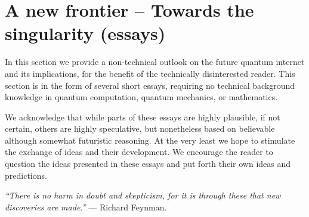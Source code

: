 %
%

\section{A new frontier -- Towards the singularity (essays)} \label{sec:outlook}  

In this section we provide a non-technical outlook on the future quantum internet and its implications, for the benefit of the technically disinterested reader. This section is in the form of several short essays, requiring no technical background knowledge in quantum computation, quantum mechanics, or mathematics.

We acknowledge that while parts of these essays are highly plausible, if not certain, others are highly speculative, but nonetheless based on believable although somewhat futuristic reasoning. At the very least we hope to stimulate the exchange of ideas and their development. We encourage the reader to question the ideas presented in these essays and put forth their own ideas and predictions.

\textit{``There is no harm in doubt and skepticism, for it is through these that new discoveries are made.''} --- Richard Feynman.

%
%



%
%



%
%



%
%



%
%



%
%



%
%



%
%



%
%

